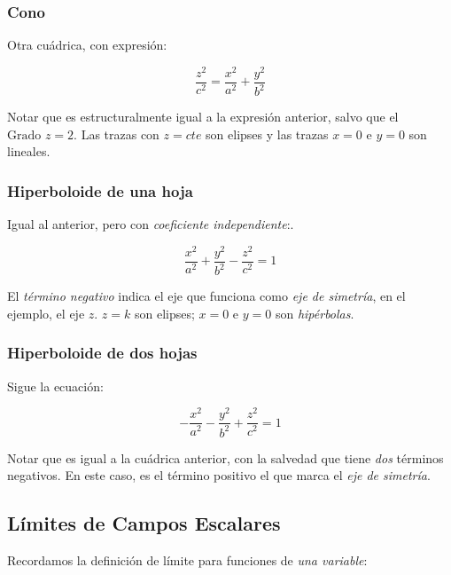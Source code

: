 \subsubsection{Cono}

Otra cuádrica, con expresión:

\begin{equation*}
    \frac{z^{2}}{c^{2}} = \frac{x^{2}}{a^{2}} + \frac{y^{2}}{b^{2}}
\end{equation*}

Notar que es estructuralmente igual a la expresión anterior, salvo que el
\(\text{Grado }z = 2\).
Las trazas con \(z = cte\) son elipses y las trazas \(x = 0\) e \(y = 0\) son
lineales.

\subsubsection{Hiperboloide de una hoja}

Igual al anterior, pero con \textit{coeficiente independiente}:.

\begin{equation*}
    \frac{x^{2}}{a^{2}} + \frac{y^{2}}{b^{2}} - \frac{z^{2}}{c^{2}} = \boxed{1}
\end{equation*}

El \textit{término negativo} indica el eje que funciona como \textit{eje de
    simetría}, en el ejemplo, el eje \(z\). \(z = k\) son elipses; \(x=0\) e \(y=0\)
son \textit{hipérbolas}.

\subsubsection{Hiperboloide de dos hojas}

Sigue la ecuación:

\begin{equation*}
    -\frac{x^{2}}{a^{2}} - \frac{y^{2}}{b^{2}} + \frac{z^{2}}{c^{2}} = \boxed{1}
\end{equation*}

Notar que es igual a la cuádrica anterior, con la salvedad que tiene
\textit{dos} términos negativos. En este caso, es el término positivo el que
marca el \textit{eje de simetría}.

\subsection{Límites de Campos Escalares}

Recordamos la definición de límite para funciones de \textit{una variable}:


